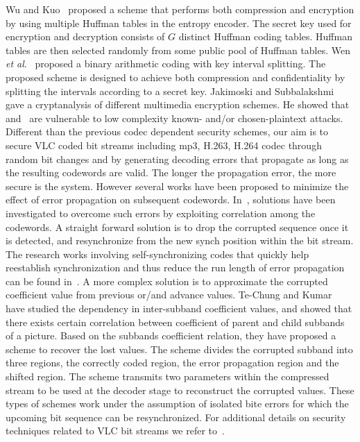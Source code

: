 \documentclass[preprint]{elsarticle}
\begin{document}
Wu and Kuo~\cite{Wu2005} proposed a scheme that performs both compression and encryption by using multiple Huffman tables in the entropy encoder. The secret key used for encryption and decryption consists of $G$ distinct Huffman coding tables. Huffman tables are then selected randomly from some public pool of Huffman tables. Wen \textit{et al}.~\cite{Jiangtao2006} proposed a binary arithmetic coding with key interval splitting. The proposed scheme is designed to achieve both compression and confidentiality by splitting the intervals according to a secret key. Jakimoski and Subbalakshmi~\cite{Jakimoski2008} gave a cryptanalysis of different multimedia encryption schemes. He showed that~\cite{Jiangtao2006}  and~\cite{Wu2005} are vulnerable to low complexity known- and/or chosen-plaintext attacks. Different than the previous codec dependent security schemes, our aim is to secure VLC coded bit streams including mp3, H.263, H.264 codec through random bit changes and by generating decoding errors that propagate as long as the resulting codewords are valid. The longer the propagation error, the more secure is the system. However several works have been proposed to minimize the effect of error propagation on subsequent codewords. In~\cite{Capocelli1992, Ferguson1984, Hemami2000, Maxted1985, Montgomery1986, Chung2002}, solutions have been investigated to overcome such errors by exploiting correlation among the codewords. A straight forward solution is to drop the corrupted sequence once it is detected, and resynchronize from the new synch position within the bit stream. The research works involving self-synchronizing codes that quickly help reestablish synchronization and thus reduce the run length of error propagation can be found in~\cite{Capocelli1992, Ferguson1984, Hemami2000, Maxted1985, Montgomery1986, Chung2002}. A more complex solution is to approximate the corrupted coefficient value from previous or/and advance values. Te-Chung and Kumar~\cite{Chung2002} have studied the dependency in inter-subband coefficient values, and showed that there exists certain correlation between coefficient of parent and child subbands of a picture. Based on the subbands coefficient relation, they have proposed a scheme to recover the lost values. The scheme divides the corrupted subband into three regions, the correctly coded region, the error propagation region and the shifted region. The scheme transmits two parameters within the compressed stream to be used at the decoder stage to reconstruct the corrupted values. These types of schemes work under the assumption of isolated bite errors for which the upcoming bit sequence can be resynchronized. For additional details on security techniques related to VLC bit streams we refer to~\cite{Kitakami2005, Maxted1985}. 
\end{document}
